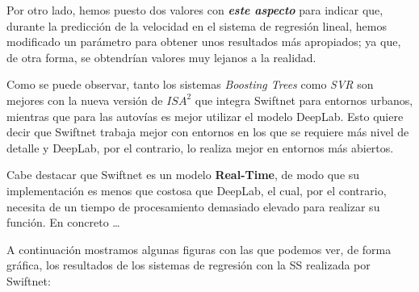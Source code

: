 Por otro lado, hemos puesto dos valores con \textit{\textbf{este aspecto}} para indicar que, durante la predicción de la velocidad en el sistema de regresión lineal, hemos modificado un parámetro para obtener unos resultados más apropiados; ya que, de otra forma, se obtendrían valores muy lejanos a la realidad. %

Como se puede observar, tanto los sistemas \textit{Boosting Trees} como \textit{\ac{SVR}} son mejores con la nueva versión de $ISA^2$ que integra Swiftnet para entornos urbanos, mientras que para las autovías es mejor utilizar el modelo DeepLab. Esto quiere decir que Swiftnet trabaja mejor con entornos en los que se requiere más nivel de detalle y DeepLab, por el contrario, lo realiza mejor en entornos más abiertos.

Cabe destacar que Swiftnet \cite{swiftnet} es un modelo \textbf{Real-Time}, de modo que su implementación es menos que costosa que DeepLab, el cual, por el contrario, necesita de un tiempo de procesamiento demasiado elevado para realizar su función. En concreto \ldots %

A continuación mostramos algunas figuras con las que podemos ver, de forma gráfica, los resultados de los sistemas de regresión con la \ac{SS} realizada por Swiftnet:


